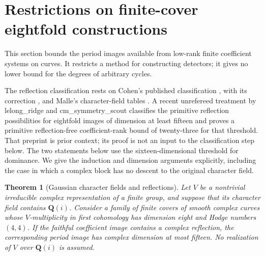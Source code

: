 \documentclass[11pt]{article}
\newtheorem{theorem}{Theorem}[section]
\theoremstyle{definition}
\theoremstyle{remark}
\newcommand{\Q}{\mathbf Q}
\begin{document}
\section{Restrictions on finite-cover eightfold constructions}
\label{sec:finite-cover-eightfolds}
This section bounds the period images available from low-rank finite coefficient systems on curves. It restricts a method for constructing detectors; it gives no lower bound for the degrees of arbitrary cycles.

The reflection classification rests on Cohen's published classification \cite[(2.4)--(2.7), pp.~386--390; (4.16), p.~412; (5.11)--(5.14), pp.~432--435]{CohenReflection}, with its correction \cite[p.~613]{CohenCorrection}, and Malle's character-field tables \cite[Tables~8.1--8.2, pp.~674--675; p.~676]{MalleFields}. A recent unrefereed treatment by lelong\_ridge and cm\_symmetry\_scout \cite[Theorems~A--B and \S\S2,5]{ReflectionSources} classifies the primitive reflection possibilities for eightfold images of dimension at least fifteen and proves a primitive reflection-free coefficient-rank bound of twenty-three for that threshold. That preprint is prior context; its proof is not an input to the classification step below. The two statements below use the sixteen-dimensional threshold for dominance. We give the induction and dimension arguments explicitly, including the case in which a complex block has no descent to the original character field.

\begin{theorem}[Gaussian character fields and reflections]
\label{thm:gaussian-reflections}
Let $V$ be a nontrivial irreducible complex representation of a
finite group, and suppose that its character field contains
$\Q(i)$.  Consider a family of finite covers of smooth complex
curves whose $V$-multiplicity in first cohomology has dimension
eight and Hodge numbers $(4,4)$.  If the faithful coefficient
image contains a complex reflection, the corresponding period
image has complex dimension at most fifteen.
No realization of $V$ over $\Q(i)$ is assumed.
\end{theorem}
\end{document}
